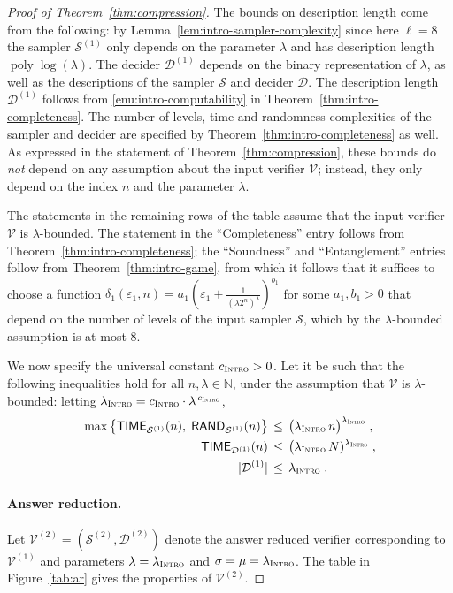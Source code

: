 \documentclass[11pt]{article}
\theoremstyle{definition}
\newcommand{\N}{\ensuremath{\mathbb{N}}}
\DeclareMathOperator{\poly}{poly}
\newcommand{\eps}{\varepsilon}
\newcommand{\sampler}{\mathcal{S}}
\newcommand{\decider}{\mathcal{D}}
\newcommand{\verifier}{\mathcal{V}}
\newcommand{\gamestyle}[1]{\ensuremath{\textsc{#1}}\xspace}
\newcommand{\intro}{\gamestyle{Intro}}
\newcommand{\TIME}{\mathsf{TIME}}
\newcommand{\RAND}{\mathsf{RAND}}
\begin{document}
\begin{proof}[Proof of Theorem~\ref{thm:compression}]
  The bounds on description length come from the following: by
  Lemma~\ref{lem:intro-sampler-complexity} since here $\ell=8$ the sampler
  $\sampler^{(1)}$ only depends on the parameter $\lambda$ and has description
  length $\poly\log(\lambda)$.
  The decider $\decider^{(1)}$ depends on the binary representation of
  $\lambda$, as well as the descriptions of the sampler $\sampler$ and decider
  $\decider$.
  The description length $\decider^{(1)}$ follows from
  \cref{enu:intro-computability} in Theorem~\ref{thm:intro-completeness}.
  The number of levels, time and randomness complexities of the sampler and
  decider are specified by Theorem~\ref{thm:intro-completeness} as well.
  As expressed in the statement of Theorem~\ref{thm:compression}, these bounds
  do \emph{not} depend on any assumption about the input verifier $\verifier$;
  instead, they only depend on the index $n$ and the parameter $\lambda$.

  The statements in the remaining rows of the table assume that the input
  verifier $\verifier$ is $\lambda$-bounded.
  The statement in the ``Completeness'' entry follows from
  Theorem~\ref{thm:intro-completeness}; the ``Soundness'' and ``Entanglement''
  entries follow from Theorem~\ref{thm:intro-game}, from which it follows that
  it suffices to choose a function $\delta_1(\eps_1,n) = a_1 \left(\eps_1 +
    \frac{1}{(\lambda 2^n)^\lambda} \right)^{b_1} $ for some $a_1,b_1 > 0$ that
  depend on the number of levels of the input sampler $\sampler$, which by the
  $\lambda$-bounded assumption is at most $8$.

  We now specify the universal constant $c_\intro>0$. Let it be such that the
  following inequalities hold for all $n, \lambda \in \N$, under the assumption
  that $\verifier$ is $\lambda$-bounded: letting $\lambda_\intro = c_\intro
  \cdot \lambda^{\, c_\intro}$,
  \begin{align*}
    \max \big\{ \TIME_{\sampler^{(1)}}(n),\; \RAND_{\sampler^{(1)}}(n) \big\}
    & \,\leq\, \big(\lambda_\intro\, n\big)^{\lambda_\intro}\;, \\
    \TIME_{\decider^{(1)}}(n)
    & \,\leq\, \big(\lambda_\intro\, N)^{\lambda_\intro}\;, \\
    |\decider^{(1)}| & \,\leq\, \lambda_\intro\;.
  \end{align*}

  \paragraph{Answer reduction.}
  Let $\verifier^{(2)} = (\sampler^{(2)},\decider^{(2)})$ denote the answer
  reduced verifier corresponding to $\verifier^{(1)}$ and parameters $\lambda =
  \lambda_\intro$ and $\sigma = \mu = \lambda_\intro$.
  The table in Figure~\ref{tab:ar} gives the properties of $\verifier^{(2)}$.


\end{proof}
\end{document}
